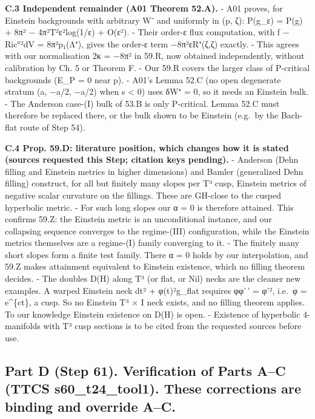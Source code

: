 \documentclass[
  10pt,
]{report}
\begin{document}
\textbf{C.3 Independent remainder (A01 Theorem 52.A).} - A01 proves, for
Einstein backgrounds with arbitrary W⁻ and uniformly in (p, ζ): P(g\_ε)
= P(g) + 8π² − 4π²\textbar T\textbar²ε²log(1/ε) + O(ε²). - Their order-ε
flux computation, with f − \textbar Ric°\textbar²dV = 8π²p₁(Λ⁺), gives
the order-ε term −8π²εR⁺(ζ,ζ) exactly. - This agrees with our
normalisation 2κ = −8π² in 59.R, now obtained independently, without
calibration by Ch. 5 or Theorem F. - Our 59.R covers the larger class of
P-critical backgrounds (E\_P = 0 near p). - A01's Lemma 52.C (no open
degenerate stratum (a, −a/2, −a/2) when s \textless{} 0) uses δW⁺ = 0,
so it needs an Einstein bulk. - The Anderson case-(I) bulk of 53.B is
only P-critical. Lemma 52.C must therefore be replaced there, or the
bulk shown to be Einstein (e.g.~by the Bach-flat route of Step 54).

\textbf{C.4 Prop. 59.D: literature position, which changes how it is
stated (sources requested this Step; citation keys pending).} - Anderson
(Dehn filling and Einstein metrics in higher dimensions) and Bamler
(generalized Dehn filling) construct, for all but finitely many slopes
per T³ cusp, Einstein metrics of negative scalar curvature on the
fillings. These are GH-close to the cusped hyperbolic metric. - For such
long slopes our α = 0 is therefore attained. This confirms 59.Z: the
Einstein metric is an unconditional instance, and our collapsing
sequence converges to the regime-(III) configuration, while the Einstein
metrics themselves are a regime-(I) family converging to it. - The
finitely many short slopes form a finite test family. There α = 0 holds
by our interpolation, and 59.Z makes attainment equivalent to Einstein
existence, which no filling theorem decides. - The doubles D(H) along T³
(or flat, or Nil) necks are the cleaner new examples. A warped Einstein
neck dt² + φ(t)²g\_flat requires φφ'\,' = φ'², i.e.~φ = e\^{}\{ct\}, a
cusp. So no Einstein T³ × I neck exists, and no filling theorem applies.
To our knowledge Einstein existence on D(H) is open. - Existence of
hyperbolic 4-manifolds with T³ cusp sections is to be cited from the
requested sources before use.

\hypertarget{part-d-step-61.-verification-of-parts-ac-ttcs-s60_t24_tool1.-these-corrections-are-binding-and-override-ac.}{%
\subsection{Part D (Step 61). Verification of Parts A--C (TTCS
s60\_t24\_tool1). These corrections are binding and override
A--C.}\label{part-d-step-61.-verification-of-parts-ac-ttcs-s60_t24_tool1.-these-corrections-are-binding-and-override-ac.}}
\end{document}
